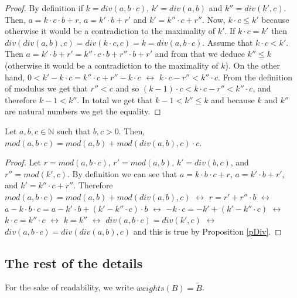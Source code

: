 \documentclass[envcountsame]{llncs}
\begin{document}
 \begin{proof}
   By definition if $k = div(a,b \cdot c)$, $k'=div(a,b)$ and
   $k''=div(k',c)$. Then, $a=k \cdot c \cdot b + r$, $a=k' \cdot b +r'$
   and $k'=k'' \cdot c + r''$. Now, $k \cdot c \leq k'$ because
   otherwise it would be a contradiction to the maximality of $k'$.  If
   $k \cdot c = k'$ then $div(div(a,b),c)=div(k \cdot c, c) =k =
   div(a, b \cdot c)$.  Assume that $k \cdot c < k'$. Then $a=k' \cdot
   b +r' = k'' \cdot c \cdot b + r'' \cdot b +r'$ and from that we
   deduce $k'' \leq k $ (otherwise it would be a contradiction to the
   maximality of $k$).  On the other hand, $0<k' -k \cdot c = k'' \cdot
   c +r'' - k \cdot c$ $\leftrightarrow$ $k \cdot c - r'' < k'' \cdot
   c$. 
From the definition of modulus
we get that $r''<c$ and so $(k-1) \cdot c<k \cdot c - r'' < k''
   \cdot c$, and therefore $k-1< k''$.  In total we get that $k-1<k'' \leq
   k$ and because $k$ and $k''$ are natural numbers we get the
   equality.
 \end{proof}\bigskip


\begin{proposition} 
  \label{pDivMod}
  Let $a,b,c\in\mathbb{N}$ such that $b,c>0$. Then, $mod(a,b\cdot
  c) = mod(a,b) + mod(div(a,b),c) \cdot c$.
\end{proposition}

\begin{proof}
  Let $r = mod(a,b \cdot c)$, $ r'=mod(a,b)$, $k'=div(b,c)$, and
  $r''=mod(k',c)$. By definition we can see that $a=k \cdot b \cdot c
  + r$, $a=k' \cdot b +r'$, and $k'=k'' \cdot c + r''$. Therefore
  $mod(a,b \cdot c)=mod(a,b)+mod(div(a,b),c) $ $\leftrightarrow$
  $r=r'+ r'' \cdot b $ $\leftrightarrow$ $a - k \cdot b \cdot c=a-k'
  \cdot b+ (k'-k'' \cdot c) \cdot b $ $\leftrightarrow$ $ - k\cdot
  c=-k' + (k'-k'' \cdot c) $ $\leftrightarrow$ $ k\cdot c=k'' \cdot c
  $ $\leftrightarrow$ $ k=k'' $ $\leftrightarrow$ $div(a,b \cdot c) =
  div(k',c)$ $\leftrightarrow$ $div(a,b \cdot c) = div(div(a,b),c)$
  and this is true by Proposition \ref{pDiv}.
\end{proof}\bigskip

\subsection{The rest of the details}
\noindent
For the sake of readability, we write $weights(B)= \tilde  B$.
\end{document}
